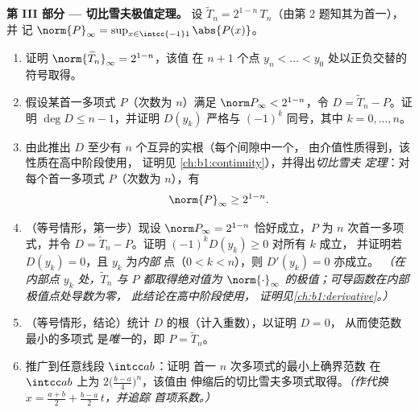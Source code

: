 \begin{problem}
\medskip
\noindent\textbf{第 III 部分 --- 切比雪夫极值定理。}
设 $\widetilde T_n = 2^{1-n}\,T_n$（由第 2 题知其为首一），并
记 $\norm{P}_\infty = \sup_{x \in \intcc{-1}1}\abs{P(x)}$。
\begin{enumerate}[resume]
  \item 证明 $\norm{\widetilde T_n}_\infty = 2^{1-n}$，该值
        在 $n + 1$ 个点 $y_n < \dots
        < y_0$ 处以正负交替的符号取得。
  \item 假设某首一多项式 $P$（次数为 $n$）满足
        $\norm P_\infty < 2^{1-n}$，令 $D = \widetilde T_n -
        P$。证明 $\deg D \leq n - 1$，并证明 $D(y_k)$
        严格与 $(-1)^k$ 同号，其中 $k = 0, \dots, n$。
  \item 由此推出 $D$ 至少有 $n$ 个互异的实根（每个间隙中一个，
        由介值性质得到，该性质在高中阶段使用，
        证明见
        \cref{ch:b1:continuity}），并得出\emph{切比雪夫
        定理}：对每个首一多项式 $P$（次数为 $n$），有
        \[
        \norm{P}_\infty \geq 2^{1-n} .
        \]
  \item （等号情形，第一步）现设 $\norm P_\infty =
        2^{1-n}$ 恰好成立，$P$ 为 $n$ 次首一多项式，并令 $D =
        \widetilde T_n - P$。证明 $(-1)^kD(y_k) \geq 0$ 对所有 $k$ 成立，
        并证明若 $D(y_k) = 0$，且 $y_k$ 为\emph{内部}
        点（$0 < k < n$），则 $D'(y_k) = 0$ 亦成立。
        \emph{（在内部点 $y_k$ 处，$\widetilde T_n$ 与
        $P$ 都取得绝对值为 $\norm{\cdot}
        _\infty$ 的极值；可导函数在内部极值点处导数为零，
        此结论在高中阶段使用，
        证明见\cref{ch:b1:derivative}。）}
  \item （等号情形，结论）统计 $D$ 的根（计入重数），以证明 $D = 0$，
        从而使范数最小的多项式
        是\emph{唯一}的，即 $P = \widetilde T_n$。
  \item 推广到任意线段 $\intcc ab$：证明
        首一 $n$ 次多项式的最小上确界范数
        在 $\intcc ab$ 上为 $2\bigl(\frac{b-a}4\bigr)^n$，该值由
        伸缩后的切比雪夫多项式取得。\emph{（作代换 $x =
        \frac{a+b}2 + \frac{b-a}2\,t$，并追踪
        首项系数。）}
\end{enumerate}


\end{problem}
